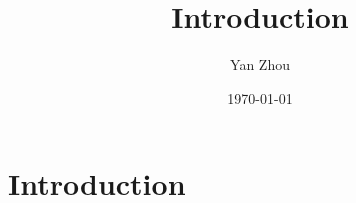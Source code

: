 \documentclass[11pt, hyper, bib, fontset=Minion]{marticle}
\title{Introduction}
\author{Yan Zhou}
\date{\today}
\begin{document}
\maketitle

\else %

\chapter{Introduction}
\label{cha:Introduction}

\fi %


\ifx\inthesis\undefined
\printbibliography
\end{document}
